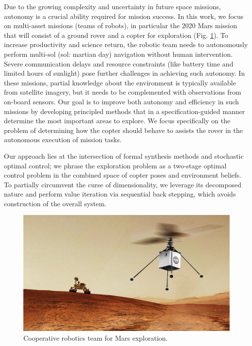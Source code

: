 \documentclass[conference]{IEEEtran}
\begin{document}
Due to the growing complexity and uncertainty in future space missions, autonomy is a crucial ability required for mission success. In this work, we focus on multi-asset missions (teams of robots), in particular the 2020 Mars mission that will consist of a ground rover and a copter for exploration (Fig. \ref{fig:heli-rover}). To increase productivity and science return, the robotic team needs to autonomously perform multi-sol (sol: martian day) navigation without human intervention. Severe communication delays and resource constraints (like battery time and limited hours of sunlight) pose further challenges in achieving such autonomy. In these missions, partial knowledge about the environment is typically available from satellite imagery, but it needs to be complemented with observations from on-board sensors. Our goal is to improve both autonomy and efficiency in such missions by developing principled methods that in a specification-guided manner determine the most important areas to explore. We focus specifically on the problem of determining how the copter should behave to assists the rover in the autonomous execution of mission tasks.


Our approach lies at the intersection of formal synthesis methods and stochastic optimal control; we phrase the exploration problem as a two-stage optimal control problem in the combined space of copter poses and environment beliefs.  
To partially circumvent the curse of dimensionality, %
we leverage its decomposed nature and perform value iteration via sequential back stepping, which avoids construction of the overall system.
\begin{figure}
  \begin{center}
    \includegraphics[width=0.8\columnwidth]{figs/heli-rover.png}
  \end{center}
  \caption{Cooperative robotics team for Mars exploration.}
  \label{fig:heli-rover}
\end{figure}
\end{document}
